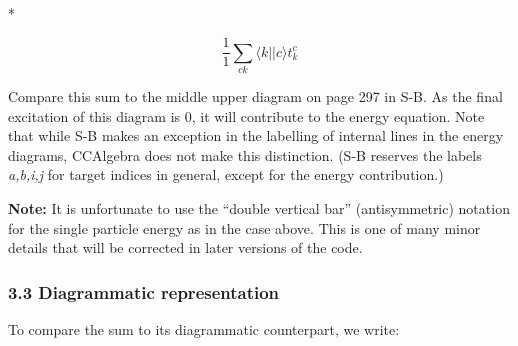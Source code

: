 \documentclass[letterpaper,10pt,english]{/Users/kinealicegulbrandsen/anaconda/lib/python2.7/site-packages/sphinx/texinputs/sphinxhowto}
\def\smaller{\fontsize{9.5pt}{9.5pt}\selectfont}
\newenvironment{InvisibleVerbatim}
        {\begin{mdframed}[leftmargin=0.1\linewidth,innerleftmargin=3pt,innerrightmargin=3pt, userdefinedwidth=1\linewidth, linewidth=0pt, linecolor=white, usetwoside=false]}
        {\end{mdframed}}
\begin{document}
    

        
        

            
                \makebox[0.1\linewidth]{\smaller\hfill\tt\color{nbframe-out-prompt}Out\hspace{4pt}{[}5{]}:\hspace{4pt}}\\*
                \vspace{-2.55\baselineskip}\begin{InvisibleVerbatim}
                \vspace{-0.5\baselineskip}
$$\frac{1}{1} \sum_{ck} \langle k || c \rangle t_{k}^{c}$$
            \end{InvisibleVerbatim}
            
        
    
Compare this sum to the middle upper diagram on page 297 in S-B. As the
final excitation of this diagram is 0, it will contribute to the energy
equation. Note that while S-B makes an exception in the labelling of
internal lines in the energy diagrams, CCAlgebra does not make this
distinction. (S-B reserves the labels \emph{a,b,i,j} for target indices
in general, except for the energy contribution.)

\textbf{Note:} It is unfortunate to use the ``double vertical bar''
(antisymmetric) notation for the single particle energy as in the case
above. This is one of many minor details that will be corrected in later
versions of the code.\subsubsection{3.3 Diagrammatic
representation}\label{diagrammatic-representation}

To compare the sum to its diagrammatic counterpart, we write:

\end{document}
